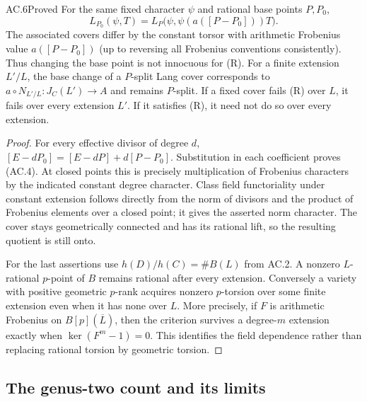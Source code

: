 \begin{claim}{AC.6}{Proved}
For the same fixed character $\psi$ and rational base points $P,P_0$,
\[
 L_{P_0}(\psi,T)
       =L_P\bigl(\psi,\psi(a([P-P_0]))T\bigr).             \tag{AC.4}
\]
The associated covers differ by the constant torsor with arithmetic
Frobenius value $a([P-P_0])$ (up to reversing all Frobenius conventions
consistently).  Thus changing the base point is not innocuous for (R).
For a finite extension $L'/L$, the base change of a $P$-split Lang cover
corresponds to $a\circ N_{L'/L}:J_C(L')\to A$ and remains $P$-split.
If a fixed cover fails (R) over $L$, it fails over every extension $L'$.
If it satisfies (R), it need not do so over every extension.
\end{claim}
\begin{proof}
For every effective divisor of degree $d$,
$[E-dP_0]=[E-dP]+d[P-P_0]$.  Substitution in each coefficient proves
(AC.4).  At closed points this is precisely multiplication of Frobenius
characters by the indicated constant degree character.  Class field
functoriality under constant extension follows directly from the norm of
divisors and the product of Frobenius elements over a closed point; it gives
the asserted norm character.  The cover stays geometrically connected and
has its rational lift, so the resulting quotient is still onto.

For the last assertions use $h(D)/h(C)=\#B(L)$ from AC.2.  A nonzero
$L$-rational $p$-point of $B$ remains rational after every extension.
Conversely a variety with positive geometric $p$-rank acquires nonzero
$p$-torsion over some finite extension even when it has none over $L$.
More precisely, if $F$ is arithmetic Frobenius on $B[p](\overline L)$,
then the criterion survives a degree-$m$ extension exactly when
$\ker(F^m-1)=0$.  This identifies the field dependence rather than
replacing rational torsion by geometric torsion.
\end{proof}

\subsection{The genus-two count and its limits}

